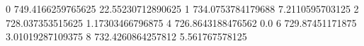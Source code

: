 0 749.4166259765625 22.55230712890625
1 734.0753784179688 7.2110595703125
2 728.037353515625 1.17303466796875
4 726.8643188476562 0.0
6 729.87451171875 3.01019287109375
8 732.4260864257812 5.561767578125

